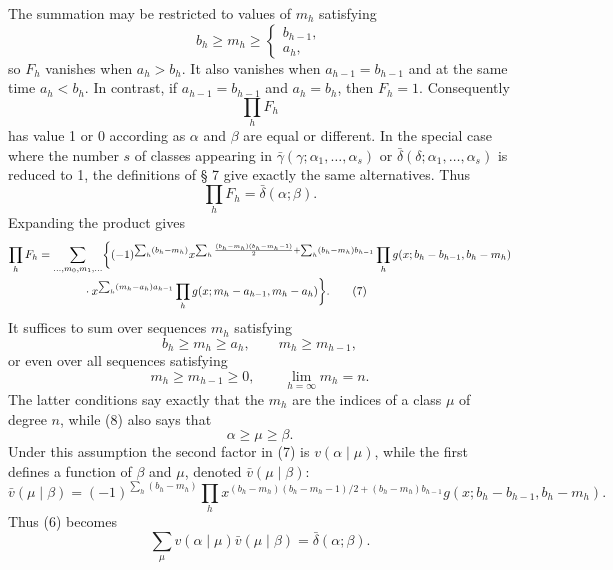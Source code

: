 The summation may be restricted to values of $m_h$ satisfying
\begin{equation}
 b_h\ge m_h\ge\begin{cases}b_{h-1},\\ a_h,
 \end{cases}
\tag{5}
\end{equation}
so $F_h$ vanishes when $a_h>b_h$. It also vanishes when $a_{h-1}=b_{h-1}$ and at the same time $a_h<b_h$. In contrast, if $a_{h-1}=b_{h-1}$ and $a_h=b_h$, then $F_h=1$. Consequently
\[
 \prod_hF_h
\]
has value 1 or 0 according as $\alpha$ and $\beta$ are equal or different. In the special case where the number $s$ of classes appearing in $\bar\gamma(\gamma;\alpha_1,\ldots,\alpha_s)$ or $\bar\delta(\delta;\alpha_1,\ldots,\alpha_s)$ is reduced to 1, the definitions of § 7 give exactly the same alternatives. Thus
\begin{equation}
 \prod_hF_h=\bar\delta(\alpha;\beta).
\tag{6}
\end{equation}
Expanding the product gives
\begin{align}
\prod_hF_h
&=\sum_{\ldots,m_0,m_1,\ldots}
\biggl\{(-1)^{\sum_h(b_h-m_h)}
 x^{\sum_h{(b_h-m_h)(b_h-m_h-1)\over2}+\sum_h(b_h-m_h)b_{h-1}}
 \prod_h g(x;b_h-b_{h-1},b_h-m_h)\notag\\
&\qquad\qquad\cdot
 x^{\sum_h(m_h-a_h)a_{h-1}}
 \prod_h g(x;m_h-a_{h-1},m_h-a_h)\biggr\}.
\tag{7}
\end{align}
It suffices to sum over sequences $m_h$ satisfying
\begin{equation}
 b_h\ge m_h\ge a_h,
 \qquad m_h\ge m_{h-1},
\tag{8}
\end{equation}
or even over all sequences satisfying
\begin{equation}
 m_h\ge m_{h-1}\ge0,
 \qquad \lim_{h=\infty}m_h=n.
\tag{9}
\end{equation}
The latter conditions say exactly that the $m_h$ are the indices of a class $\mu$ of degree $n$, while (8) also says that
\[
 \alpha\ge\mu\ge\beta.
\]
Under this assumption the second factor in (7) is $v(\alpha\mid\mu)$, while the first defines a function of $\beta$ and $\mu$, denoted $\bar v(\mu\mid\beta)$:
\begin{equation}
 \bar v(\mu\mid\beta)=(-1)^{\sum_h(b_h-m_h)}
 \prod_h x^{(b_h-m_h)(b_h-m_h-1)/2+(b_h-m_h)b_{h-1}}
 g(x;b_h-b_{h-1},b_h-m_h).
\tag{10}
\end{equation}
Thus (6) becomes
\begin{equation}
 \sum_{\mu}v(\alpha\mid\mu)\bar v(\mu\mid\beta)=\bar\delta(\alpha;\beta).
\tag{11}
\end{equation}
